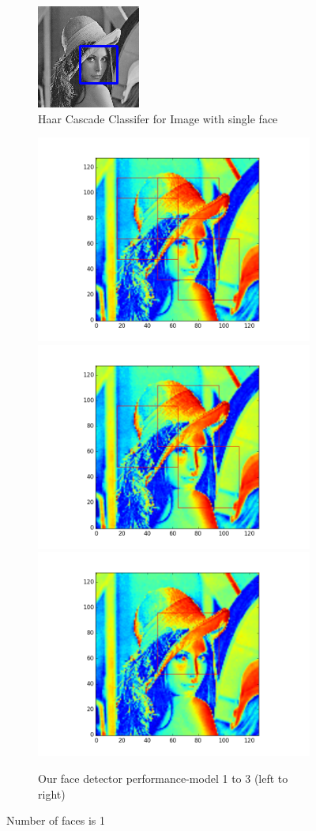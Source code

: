 \documentclass{article}
\begin{document}
\begin{figure}[h]
  \begin{subfigure}{\linewidth}
  \centering
  \includegraphics[width=.3\linewidth]{lenahaar.png}\hfill
  \caption{Haar Cascade Classifer for Image with single face}
  \end{subfigure}\par\medskip
  \begin{subfigure}{\linewidth}
  \includegraphics[width=.3\linewidth]{lena83.png}\hfill
  \includegraphics[width=.3\linewidth]{lena91.png}\hfill
  \includegraphics[width=.3\linewidth]{lena94.png}
  \caption{Our face detector performance-model 1 to 3 (left to right)}
  \end{subfigure}\par\medskip
  \caption{Number of faces is 1}
\end{figure}
\end{document}
